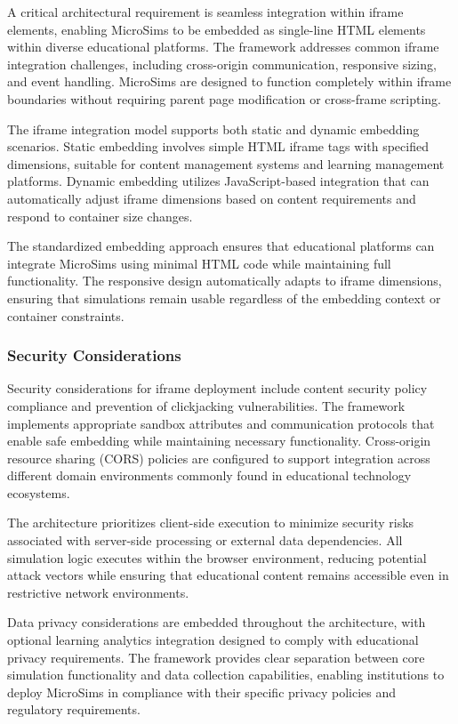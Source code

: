 A critical architectural requirement is seamless integration within iframe elements, enabling MicroSims to be embedded as single-line HTML elements within diverse educational platforms. The framework addresses common iframe integration challenges, including cross-origin communication, responsive sizing, and event handling. MicroSims are designed to function completely within iframe boundaries without requiring parent page modification or cross-frame scripting.

The iframe integration model supports both static and dynamic embedding scenarios. Static embedding involves simple HTML iframe tags with specified dimensions, suitable for content management systems and learning management platforms. Dynamic embedding utilizes JavaScript-based integration that can automatically adjust iframe dimensions based on content requirements and respond to container size changes.

The standardized embedding approach ensures that educational platforms can integrate MicroSims using minimal HTML code while maintaining full functionality. The responsive design automatically adapts to iframe dimensions, ensuring that simulations remain usable regardless of the embedding context or container constraints.

\subsubsection{Security Considerations}

Security considerations for iframe deployment include content security policy compliance and prevention of clickjacking vulnerabilities. The framework implements appropriate sandbox attributes and communication protocols that enable safe embedding while maintaining necessary functionality. Cross-origin resource sharing (CORS) policies are configured to support integration across different domain environments commonly found in educational technology ecosystems.

The architecture prioritizes client-side execution to minimize security risks associated with server-side processing or external data dependencies. All simulation logic executes within the browser environment, reducing potential attack vectors while ensuring that educational content remains accessible even in restrictive network environments.

Data privacy considerations are embedded throughout the architecture, with optional learning analytics integration designed to comply with educational privacy requirements. The framework provides clear separation between core simulation functionality and data collection capabilities, enabling institutions to deploy MicroSims in compliance with their specific privacy policies and regulatory requirements.

